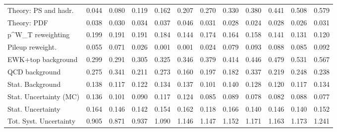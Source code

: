 \begin{tabular}{l|p{0.6cm}p{0.6cm}p{0.6cm}p{0.6cm}p{0.6cm}p{0.6cm}p{0.6cm}p{0.6cm}p{0.6cm}p{0.6cm}p{0.6cm}}
Theory: PS and hadr.                     & 0.044 & 0.080 & 0.119 & 0.162 & 0.207 & 0.270 & 0.330 & 0.380 & 0.441 & 0.508 & 0.579 \\
Theory: PDF                              & 0.038 & 0.030 & 0.034 & 0.037 & 0.046 & 0.031 & 0.028 & 0.024 & 0.028 & 0.026 & 0.031 \\
p^{W}_{T} reweighting                    & 0.199 & 0.191 & 0.191 & 0.184 & 0.144 & 0.174 & 0.164 & 0.158 & 0.141 & 0.131 & 0.120 \\
Pileup reweight.                         & 0.055 & 0.071 & 0.026 & 0.001 & 0.001 & 0.024 & 0.079 & 0.093 & 0.088 & 0.085 & 0.092 \\
EWK+top background                       & 0.299 & 0.291 & 0.305 & 0.325 & 0.346 & 0.379 & 0.414 & 0.446 & 0.479 & 0.531 & 0.567 \\
QCD background                           & 0.275 & 0.341 & 0.211 & 0.273 & 0.160 & 0.197 & 0.182 & 0.337 & 0.219 & 0.248 & 0.238 \\
Stat. Background                         & 0.138 & 0.117 & 0.122 & 0.134 & 0.137 & 0.101 & 0.140 & 0.128 & 0.120 & 0.117 & 0.134 \\
Stat. Uncertainty (MC)                   & 0.136 & 0.101 & 0.090 & 0.117 & 0.124 & 0.085 & 0.089 & 0.078 & 0.082 & 0.088 & 0.077 \\
\hline
Stat. Uncertainty                        & 0.164 & 0.146 & 0.142 & 0.154 & 0.162 & 0.118 & 0.166 & 0.140 & 0.146 & 0.140 & 0.152 \\
\hline
Tot. Syst. Uncertainty                   & 0.905 & 0.871 & 0.937 & 1.090 & 1.146 & 1.147 & 1.152 & 1.171 & 1.163 & 1.173 & 1.241 \\
\hline
\end{tabular}
